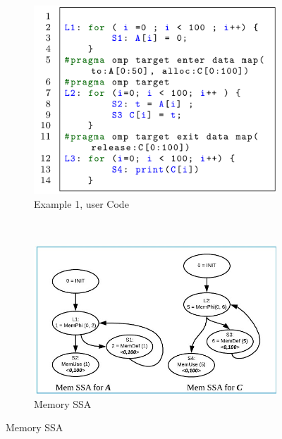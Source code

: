 \begin{figure}[h!]
    \centering
    \begin{subfigure}[b]{0.45\textwidth}
        \includegraphics[width=\textwidth]{images/memorySSA-example1.png}
        \caption{Example 1, user Code}
        \label{fig:memorySSA-example1-s4}
    \end{subfigure}
    ~ %
    \begin{subfigure}[b]{0.5\textwidth}
        \includegraphics[width=\textwidth]{images/memorySSA-example1-s1.jpg}
        \caption{Memory SSA}
        \label{fig:memorySSA-example1-s1}
    \end{subfigure}
    

\end{figure}
